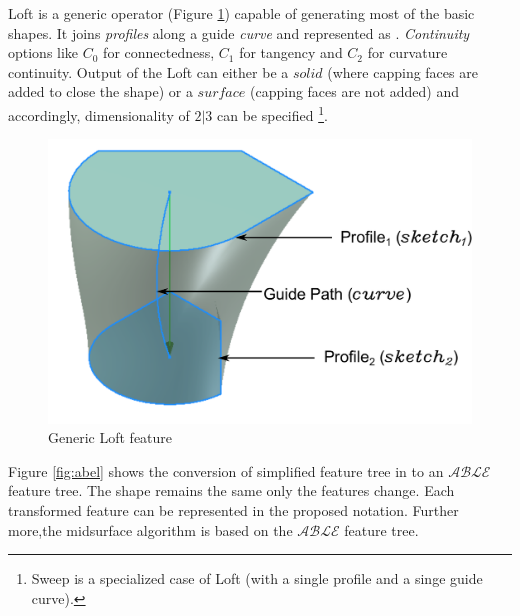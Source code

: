 
Loft is a generic operator (Figure \ref{figure_Loft})  capable of generating most of the basic shapes. It joins {\em profiles} along a guide {\em curve} and represented as .  {\em Continuity} options like $C_0$ for connectedness, $C_1$ for tangency and $C_2$ for curvature continuity. Output of the Loft can either be a $solid$ (where capping faces are added to close the shape) or a $surface$ (capping faces are not added) and accordingly, dimensionality of $2|3$ can be specified \footnote{Sweep is a specialized case of Loft (with a single profile and a singe guide curve).}.


\begin{figure}[!htp]
	\centering
	\includegraphics[width=0.45\linewidth]{../Common/images//LoftPreview.pdf} 
	\caption{Generic Loft feature}
	\label{figure_Loft}
\end{figure}


	

Figure \ref{fig:abel} shows the conversion of simplified feature tree in to an $\mathcal{ABLE}$ feature tree.  The shape remains the same only the features change.
 Each transformed feature can be represented in the proposed notation. Further more,the midsurface algorithm is based on the $\mathcal{ABLE}$ feature tree.
 
